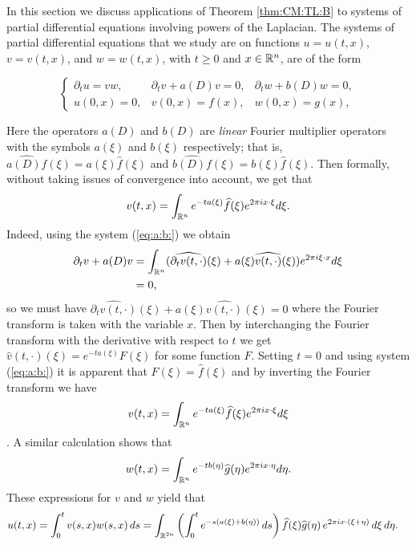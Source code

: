 {In this section we discuss applications of Theorem \ref{thm:CM:TL:B} to systems of partial differential equations involving powers of the Laplacian. The systems of partial differential equations that we study are on functions $u=u(t,x)$, $v=v(t,x)$, and $w=w(t,x)$, with $t\geq 0$ and $x\in{{\mathbb R}^n}$, are of the form

\begin{equation} \label{eq:a:b:}
\left\{ \begin{array}{lll}  \partial_t u =vw, & \partial_t v +a(D) v = 0, & \partial_t w + b(D) w = 0, \\
  u(0,x)=0,&v(0,x)=f(x),&w(0,x) = g(x),
 \end{array} \right.
\end{equation}

Here the operators $a(D)$ and $b(D)$ are \textit{linear} Fourier multiplier operators with the symbols $a(\xi)$ and $b(\xi)$ respectively; that is, $\widehat{a(D)f}(\xi) = a(\xi)\widehat{f}(\xi)$ and $\widehat{b(D)f}(\xi) = b(\xi)\widehat{f}(\xi)$. Then formally, without taking issues of convergence into account, we get that 
\begin{equation}
v(t,x) = \int_{{\mathbb R}^n} e^{-ta(\xi)} \widehat{f}(\xi)e^{2\pi i x\cdot \xi} d\xi.
\end{equation}
Indeed, using the system (\ref{eq:a:b:}) we obtain
\begin{align*}
\partial_t v +a(D) v &= \int_{{\mathbb R}^n} (\widehat{\partial_t v(t,\cdot)}(\xi) + a(\xi)\widehat{v(t,\cdot)}(\xi))e^{2\pi i \xi \cdot x} d\xi \\
&=0,
\end{align*}
so we must have $\widehat{\partial_t v(t,\cdot)}(\xi) + a(\xi)\widehat{v(t,\cdot)}(\xi) = 0$ where the Fourier transform is taken with the variable $x$. Then by interchanging the Fourier transform with the derivative with respect to $t$ we get $\widehat{v}(t,\cdot)(\xi) = e^{-t a(\xi)} F(\xi)$ for some function $F$. Setting $t=0$ and using system (\ref{eq:a:b:}) it is apparent that $F(\xi) = \widehat{f}(\xi)$ and by inverting the Fourier transform we have $$v(t,x) = \int_{{\mathbb R}^n} e^{-t a(\xi)} \widehat{f}(\xi) e^{2\pi i x\cdot \xi} d\xi$$. A similar calculation shows that $$w(t,x) = \int_{{\mathbb R}^n} e^{-tb(\eta)} \widehat{g}(\eta) e^{2\pi i x\cdot \eta} d\eta.$$
These expressions for $v$ and $w$ yield that
\begin{align*}
u(t,x) & = \int_0^t v(s,x) w(s,x) \,ds  = \int_{\mathbb{R}^{2n}} \left(\int_0^t e^{-s (a(\xi)+b(\eta))} \,ds \right) \widehat{f}(\xi) \widehat{g}(\eta) \, e^{2\pi i x \cdot (\xi + \eta)} \, d\xi\, d\eta.
\end{align*}
}
